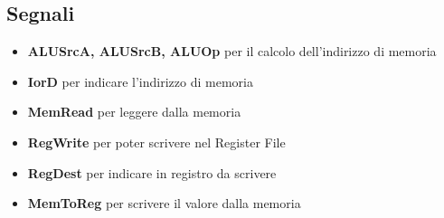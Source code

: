 \subsection{Segnali}
\begin{itemize}
    \item \textbf{ALUSrcA, ALUSrcB, ALUOp} per il calcolo dell'indirizzo di memoria
    \item \textbf{IorD} per indicare l'indirizzo di memoria
    \item \textbf{MemRead} per leggere dalla memoria
    \item \textbf{RegWrite} per poter scrivere nel Register File
    \item \textbf{RegDest} per indicare in registro da scrivere
    \item \textbf{MemToReg} per scrivere il valore dalla memoria
\end{itemize}